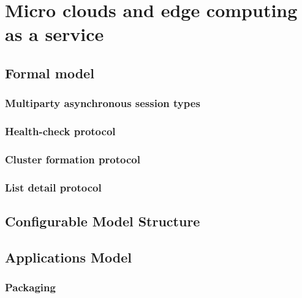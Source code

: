 \chapter{Micro clouds and edge computing as a service}\label{chapter:Micro_clouds}
%
%
%



\section{Formal model}\label{sec:formal_model}
%
%



\subsection{Multiparty asynchronous session types}\label{sec:multiparty}
%
%



\subsection{Health-check protocol}\label{sec:health_check_protocol}
%
%



\subsection{Cluster formation protocol}\label{sec:cluster_formation_protocol}
%
%



\subsection{List detail protocol}\label{sec:list_detail_protocol}
%
%



\section{Configurable Model Structure}\label{sec:configurable_model_structure}
%
%



\section{Applications Model}\label{sec:application_model}
%
%



\subsection{Packaging}\label{sec:packaging}
%
%



